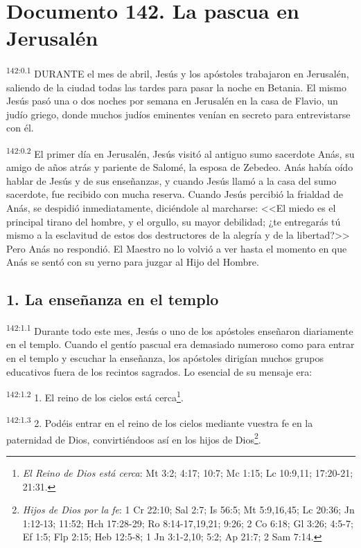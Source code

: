 \chapter{Documento 142. La pascua en Jerusalén}
\par 
\textsuperscript{142:0.1} DURANTE el mes de abril, Jesús y los apóstoles trabajaron en Jerusalén, saliendo de la ciudad todas las tardes para pasar la noche en Betania. El mismo Jesús pasó una o dos noches por semana en Jerusalén en la casa de Flavio, un judío griego, donde muchos judíos eminentes venían en secreto para entrevistarse con él.

\par 
\textsuperscript{142:0.2} El primer día en Jerusalén, Jesús visitó al antiguo sumo sacerdote Anás, su amigo de años atrás y pariente de Salomé, la esposa de Zebedeo. Anás había oído hablar de Jesús y de sus enseñanzas, y cuando Jesús llamó a la casa del sumo sacerdote, fue recibido con mucha reserva. Cuando Jesús percibió la frialdad de Anás, se despidió inmediatamente, diciéndole al marcharse: <<El miedo es el principal tirano del hombre, y el orgullo, su mayor debilidad; ¿te entregarás tú mismo a la esclavitud de estos dos destructores de la alegría y de la libertad?>> Pero Anás no respondió. El Maestro no lo volvió a ver hasta el momento en que Anás se sentó con su yerno para juzgar al Hijo del Hombre.

\section*{1. La enseñanza en el templo}
\par 
\textsuperscript{142:1.1} Durante todo este mes, Jesús o uno de los apóstoles enseñaron diariamente en el templo. Cuando el gentío pascual era demasiado numeroso como para entrar en el templo y escuchar la enseñanza, los apóstoles dirigían muchos grupos educativos fuera de los recintos sagrados. Lo esencial de su mensaje era:

\par 
\textsuperscript{142:1.2} 1. El reino de los cielos está cerca\footnote{\textit{El Reino de Dios está cerca}: Mt 3:2; 4:17; 10:7; Mc 1:15; Lc 10:9,11; 17:20-21; 21:31.}.

\par 
\textsuperscript{142:1.3} 2. Podéis entrar en el reino de los cielos mediante vuestra fe en la paternidad de Dios, convirtiéndoos así en los hijos de Dios\footnote{\textit{Hijos de Dios por la fe}: 1 Cr 22:10; Sal 2:7; Is 56:5; Mt 5:9,16,45; Lc 20:36; Jn 1:12-13; 11:52; Hch 17:28-29; Ro 8:14-17,19,21; 9:26; 2 Co 6:18; Gl 3:26; 4:5-7; Ef 1:5; Flp 2:15; Heb 12:5-8; 1 Jn 3:1-2,10; 5:2; Ap 21:7; 2 Sam 7:14.}.

